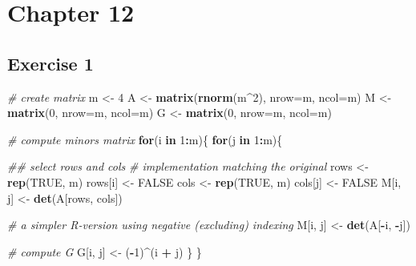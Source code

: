 \documentclass[
]{book}
\newenvironment{Shaded}{\begin{snugshade}}{\end{snugshade}}
\newcommand{\CommentTok}[1]{\textcolor[rgb]{0.56,0.35,0.01}{\textit{#1}}}
\newcommand{\ControlFlowTok}[1]{\textcolor[rgb]{0.13,0.29,0.53}{\textbf{#1}}}
\newcommand{\DataTypeTok}[1]{\textcolor[rgb]{0.13,0.29,0.53}{#1}}
\newcommand{\DecValTok}[1]{\textcolor[rgb]{0.00,0.00,0.81}{#1}}
\newcommand{\KeywordTok}[1]{\textcolor[rgb]{0.13,0.29,0.53}{\textbf{#1}}}
\newcommand{\NormalTok}[1]{#1}
\newcommand{\OperatorTok}[1]{\textcolor[rgb]{0.81,0.36,0.00}{\textbf{#1}}}
\newcommand{\OtherTok}[1]{\textcolor[rgb]{0.56,0.35,0.01}{#1}}
\newcommand{\StringTok}[1]{\textcolor[rgb]{0.31,0.60,0.02}{#1}}
\begin{document}
\hypertarget{chapter-12-1}{%
\section*{Chapter 12}\label{chapter-12-1}}

\hypertarget{exercise-1-8}{%
\subsection*{Exercise 1}\label{exercise-1-8}}

\begin{Shaded}
\begin{Highlighting}[]
\CommentTok{\# create matrix}
\NormalTok{m \textless{}{-}}\StringTok{ }\DecValTok{4}
\NormalTok{A \textless{}{-}}\StringTok{ }\KeywordTok{matrix}\NormalTok{(}\KeywordTok{rnorm}\NormalTok{(m}\OperatorTok{\^{}}\DecValTok{2}\NormalTok{), }\DataTypeTok{nrow=}\NormalTok{m, }\DataTypeTok{ncol=}\NormalTok{m)}
\NormalTok{M \textless{}{-}}\StringTok{ }\KeywordTok{matrix}\NormalTok{(}\DecValTok{0}\NormalTok{, }\DataTypeTok{nrow=}\NormalTok{m, }\DataTypeTok{ncol=}\NormalTok{m)}
\NormalTok{G \textless{}{-}}\StringTok{ }\KeywordTok{matrix}\NormalTok{(}\DecValTok{0}\NormalTok{, }\DataTypeTok{nrow=}\NormalTok{m, }\DataTypeTok{ncol=}\NormalTok{m)}

\CommentTok{\# compute minors matrix}
\ControlFlowTok{for}\NormalTok{(i }\ControlFlowTok{in} \DecValTok{1}\OperatorTok{:}\NormalTok{m)\{}
  \ControlFlowTok{for}\NormalTok{(j }\ControlFlowTok{in} \DecValTok{1}\OperatorTok{:}\NormalTok{m)\{}
    
    \CommentTok{\#\# select rows and cols}
    \CommentTok{\# implementation matching the original}
\NormalTok{    rows \textless{}{-}}\StringTok{ }\KeywordTok{rep}\NormalTok{(}\OtherTok{TRUE}\NormalTok{, m)}
\NormalTok{    rows[i] \textless{}{-}}\StringTok{ }\OtherTok{FALSE}
\NormalTok{    cols \textless{}{-}}\StringTok{ }\KeywordTok{rep}\NormalTok{(}\OtherTok{TRUE}\NormalTok{, m)}
\NormalTok{    cols[j] \textless{}{-}}\StringTok{ }\OtherTok{FALSE}
\NormalTok{    M[i, j] \textless{}{-}}\StringTok{ }\KeywordTok{det}\NormalTok{(A[rows, cols])}
    
    \CommentTok{\# a simpler R{-}version using negative (excluding) indexing}
\NormalTok{    M[i, j] \textless{}{-}}\StringTok{ }\KeywordTok{det}\NormalTok{(A[}\OperatorTok{{-}}\NormalTok{i, }\OperatorTok{{-}}\NormalTok{j])}
    
    \CommentTok{\# compute G}
\NormalTok{    G[i, j] \textless{}{-}}\StringTok{ }\NormalTok{(}\OperatorTok{{-}}\DecValTok{1}\NormalTok{)}\OperatorTok{\^{}}\NormalTok{(i }\OperatorTok{+}\StringTok{ }\NormalTok{j)}
\NormalTok{  \}}
\NormalTok{\}}


\end{Highlighting}
\end{Shaded}
\end{document}
